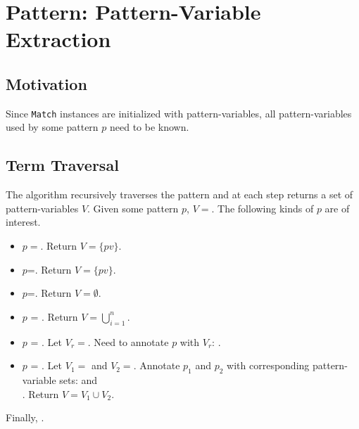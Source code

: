 \section{Pattern: Pattern-Variable Extraction}
\label{section:pv-extraction}

\subsection{Motivation}
Since \texttt{Match} instances are initialized with pattern-variables, all pattern-variables used by some pattern $p$ need to be known. 

\subsection{Term Traversal}
The algorithm recursively traverses the pattern and at each step returns a set of pattern-variables $V$. Given some pattern $p$, $V=$. The following kinds of $p$ are of interest.

\begin{itemize}
\item $p=$\NonTerminal. Return $V = \{ pv \}$.
\item $p$=\BuiltInPattern. Return $V=\{ pv \}$.
\item $p$=\LiteralPattern. Return $V=\emptyset$.
\item $p$ = \PatternSequence. Return $V=\bigcup_{i=1}^{n}$.
\item $p$ = \PatternRepeat. Let $V_r=$. Need to annotate $p$ with $V_r$: .
\item $p$ = \PatternInHole. Let $V_1=$ and  $V_2=$. Annotate $p_1$ and $p_2$ with corresponding pattern-variable sets:  and \\ . Return $V = V_1 \cup V_2$.
\end{itemize}

Finally, .
